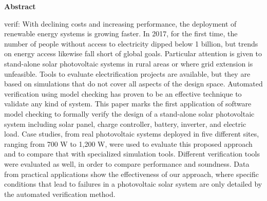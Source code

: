 \thispagestyle{plain}
\begin{center}
%    
%    
%    
    \vspace{0.9cm}
    \textbf{Abstract}
\end{center}
verif:
With declining costs and increasing performance, the deployment of renewable energy systems is growing faster. In 2017, for the first time, the number of people without access to electricity dipped below 1 billion, but trends on energy access likewise fall short of global goals. Particular attention is given to stand-alone solar photovoltaic systems in rural areas or where grid extension is unfeasible. Tools to evaluate electrification projects are available, but they are based on simulations that do not cover all aspects of the design space. Automated verification using model checking has proven to be an effective technique to validate any kind of system. This paper marks the first application of software model checking to formally verify the design of a stand-alone solar photovoltaic system including solar panel, charge controller, battery, inverter, and electric load. Case studies, from real photovoltaic systems deployed in five different sites, ranging from 700 W to 1,200 W, were used to evaluate this proposed approach and to compare that with specialized simulation tools. Different verification tools were evaluated as well, in order to compare performance and soundness. Data from practical applications show the effectiveness of our approach, where specific conditions that lead to failures in a photovoltaic solar system are only detailed by the automated verification method.





